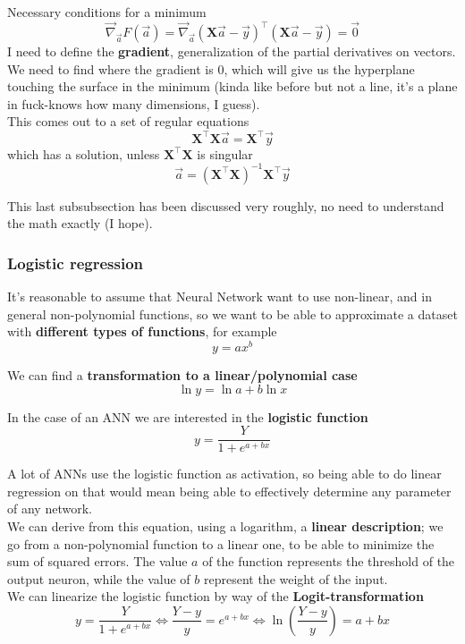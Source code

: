Necessary conditions for a minimum
$$ \vec{\nabla}_{\vec{a}} F(\vec{a}) = \vec{\nabla}_{\vec{a}} \left(\bm{X} \vec{a} - \vec{y}\right)^{\top} \left(\bm{X} \vec{a} - \vec{y}\right) = \vec{0} $$
I need to define the \textbf{gradient}, generalization of the partial derivatives on vectors. We need to find where the gradient is 0, which will give us the hyperplane touching the surface in the minimum (kinda like before but not a line, it's a plane in fuck-knows how many dimensions, I guess).\\

This comes out to a set of regular equations
$$ \bm{X}^{\top} \bm{X} \vec{a} = \bm{X}^{\top} \vec{y} $$
which has a solution, unless $\bm{X}^{\top} \bm{X}$ is singular 
$$ \vec{a} = \left(\bm{X}^{\top} \bm{X}\right)^{-1} \bm{X}^{\top} \vec{y} $$

\vfill 

This last subsubsection has been discussed very roughly, no need to understand the math exactly (I hope).

\newpage

\subsubsection{Logistic regression}
It's reasonable to assume that Neural Network want to use non-linear, and in general non-polynomial functions, so we want to be able to approximate a dataset with \textbf{different types of functions}, for example
$$ y = ax^b$$

We can find a \textbf{transformation to a linear/polynomial case}
$$ \ln y = \ln a + b \ln x $$

In the case of an ANN we are interested in the \textbf{logistic function}
$$ y = \frac{Y}{1 + e^{a+bx}} $$ 

A lot of ANNs use the logistic function as activation, so being able to do linear regression on that would mean being able to effectively determine any parameter of any network.\\

We can derive from this equation, using a logarithm, a \textbf{linear description}; we go from a non-polynomial function to a linear one, to be able to minimize the sum of squared errors. The value $a$ of the function represents the threshold of the output neuron, while the value of $b$ represent the weight of the input. \\

We can linearize the logistic function by way of the \textbf{Logit-transformation}
$$ y = \frac{Y}{1 + e^{a+bx}} \Leftrightarrow \frac{Y - y}{y} = e^{a + bx} \Leftrightarrow \ln \left(\frac{Y - y}{y}\right) = a + bx $$

